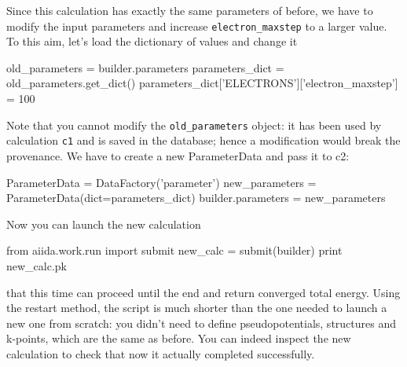 Since this calculation has exactly the same parameters of before, we have to modify the input parameters and increase \texttt{electron\_maxstep} to a larger value.
To this aim, let's load the dictionary of values and change it
\begin{pythoncommand}
old_parameters = builder.parameters
parameters_dict = old_parameters.get_dict()
parameters_dict['ELECTRONS']['electron_maxstep'] = 100
\end{pythoncommand}
Note that you cannot modify the \texttt{old\_parameters} object: it has been used by calculation \texttt{c1} and is saved in the database; hence a modification would break the provenance.
We have to create a new ParameterData and pass it to c2:
\begin{pythoncommand}
ParameterData = DataFactory('parameter')
new_parameters = ParameterData(dict=parameters_dict)
builder.parameters = new_parameters
\end{pythoncommand}
Now you can launch the new calculation
\begin{pythoncommand}
from aiida.work.run import submit    
new_calc = submit(builder)
print new_calc.pk
\end{pythoncommand}
that this time can proceed until the end and return converged total energy.
Using the restart method, the script is much shorter than the one needed to launch a new one from scratch: you didn't need to define pseudopotentials, structures and k-points, which are the same as before. 
You can indeed inspect the new calculation to check that now it actually 
completed successfully.
